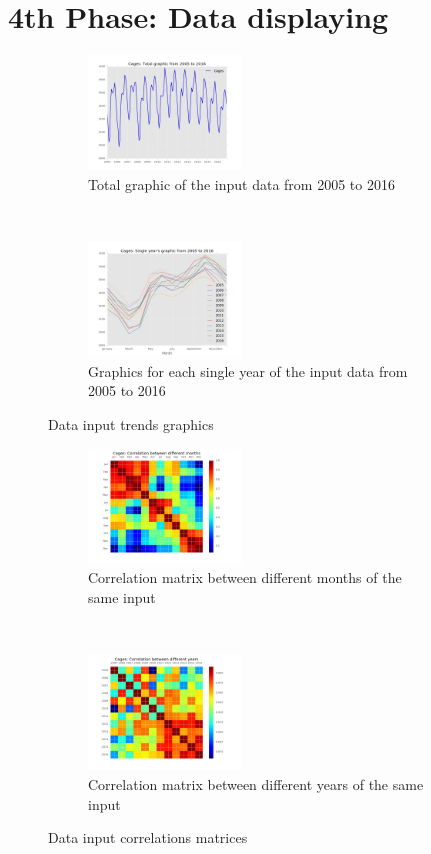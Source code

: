 \newpage
\section{4th Phase: Data displaying}
\iffalse

\begin{figure}[h]
    \centering
    \begin{subfigure}[t]{0.5\textwidth}
        \centering
        \includegraphics[height=1.2in]{Files/Cages_Total.jpg}
        \caption{Total graphic of the input data from 2005 to 2016}
    \end{subfigure}%
    ~ 
    \begin{subfigure}[t]{0.5\textwidth}
        \centering
        \includegraphics[height=1.2in]{Files/Cages_Years.jpg}
        \caption{Graphics for each single year of the input data from 2005 to 2016}
    \end{subfigure}
    \caption{Data input trends graphics}
\end{figure}

\begin{figure}[h]

    \begin{subfigure}[t]{0.5\textwidth}
        \centering
        \includegraphics[height=1.2in]{Files/Cages_Months_Matrix.jpg}
        \caption{Correlation matrix between different months of the same input}
    \end{subfigure}%
    ~ 
    \begin{subfigure}[t]{0.5\textwidth}
        \centering
        \includegraphics[height=1.2in]{Files/Cages_Years_Matrix.jpg}
        \caption{Correlation matrix between different years of the same input}
    \end{subfigure}
    \caption{Data input correlations matrices}
\end{figure}

